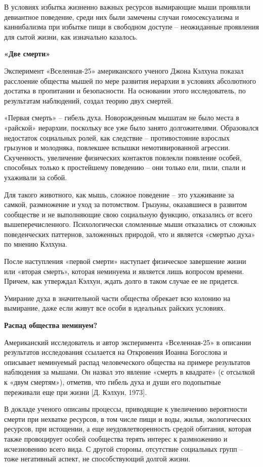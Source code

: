 В условиях избытка жизненно важных ресурсов вымирающие мыши проявляли девиантное поведение, среди них были замечены случаи гомосексуализма и каннибализма при избытке пищи в свободном доступе – неожиданные проявления для сытой жизни, как изначально казалось.

\textbf{«Две смерти»}

Эксперимент «Вселенная-25» американского ученого Джона  Кэлхуна показал расслоение общества мышей по мере развития иерархии в условиях абсолютного достатка в пропитании и безопасности. На основании этого исследователь, по результатам наблюдений, создал теорию двух смертей.

«Первая смерть» – гибель духа. Новорожденным мышатам не было места в «райской» иерархии, поскольку все уже было занято долгожителями. Образовался недостаток социальных ролей, как следствие – противостояние взрослых грызунов и молодняка, повлекшее вспышки немотивированной агрессии. Скученность, увеличение физических контактов повлекли появление особей, способных только к простейшему поведению – они только ели, пили, спали и ухаживали за собой.

Для такого животного, как мышь, сложное поведение – это ухаживание за самкой, размножение и уход за потомством. Грызуны, оказавшиеся в развитом сообществе и не выполняющие свою социальную функцию, отказались от всего вышеперечисленного. Психологически сломленные мыши отказались от сложных поведенческих паттернов, заложенных природой, что и является «смертью духа» по мнению Кэлхуна.

После наступления «первой смерти» наступает физическое завершение жизни или «вторая смерть», которая неминуема и является лишь вопросом времени. Причем, как утверждал Кэлхун, ждать долго в таком случае ее не придется.

Умирание духа в значительной части общества обрекает всю колонию на вымирание, даже если живут все особи в идеальных райских условиях.

\textbf{Распад общества неминуем?}

Американский исследователь и автор эксперимента «Вселенная-25» в описании результатов исследования ссылается на Откровения Иоанна Богослова и описывает неминуемый распад человеческого общества на примере результатов наблюдения за мышами. Он назвал это явление «смерть в квадрате» (с отсылкой к «двум смертям»), отметив, что гибель духа и души его подопытные переживали еще при жизни [Д.  Кэлхун, 1973].

В докладе ученого описаны процессы, приводящие к увеличению вероятности смерти при нехватке ресурсов, в том числе пищи и воды, жилья, экологических ресурсов, при истощении, а еще неудовлетворенность средой обитания, которая также провоцирует особей сообщества терять интерес к размножению и исчезновению всего вида. С другой стороны, отсутствие социальных групп – тоже негативный аспект, не способствующий долгой жизни.

